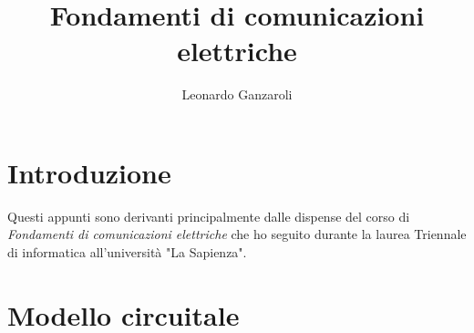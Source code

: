 \documentclass{article}
\title{Fondamenti di comunicazioni elettriche}
\author{Leonardo Ganzaroli}
\date{}
\begin{document}
\maketitle


\tableofcontents

\newpage

\hypersetup{allcolors=black}

\section*{Introduzione}

Questi appunti sono derivanti principalmente dalle dispense del corso di \textit{Fondamenti di comunicazioni elettriche} che ho seguito durante la laurea Triennale di informatica all'università "La Sapienza".

\newpage

\section{Modello circuitale}
\end{document}
